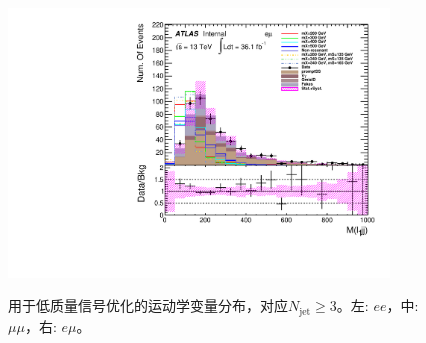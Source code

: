 \begin{figure}[h]
\begin{minipage}[t]{0.33\linewidth}
 \end{minipage}
 \begin{minipage}[t]{0.33\linewidth}
 \centering
 \includegraphics[width=0.9\textwidth,angle=-90]{fig/dataMC_high_Njet_CR/m_l1jj_emu.pdf}\label{fig:dataMC_high_Njet_CR:m_l1jj_emu.pdf}
 \end{minipage}
 \caption{用于低质量信号优化的运动学变量分布，对应$N_{\text{jet}}\geq3$。左: $ee$，中: $\mu\mu$，右: $e\mu$。}
\label{fig:SigOpt_high_kine}
\end{figure}
